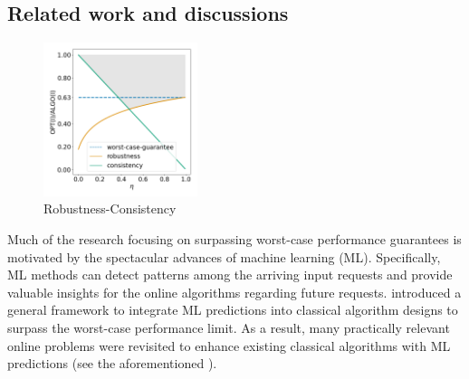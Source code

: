 \subsection{Related work and discussions}

\begin{figure}
 \vspace{-0.6cm}
  \begin{center}
    \includegraphics[width=0.4\textwidth]{../paper/Img/consistency_robustness.png}
  \end{center}
  \vspace{-0.6cm}
  \caption{Robustness-Consistency}
  \label{fig:robustness-consistency}
   \vspace{-0.5cm}
\end{figure}

Much of the research focusing on surpassing worst-case performance guarantees is motivated by the spectacular advances of machine learning (ML). Specifically, ML methods can detect patterns among the arriving input requests and provide valuable insights for the online algorithms regarding future requests. \cite{LykourisVassilvtiskii18:Competitive-caching} introduced a general framework to integrate ML predictions into classical algorithm designs to surpass the worst-case performance limit.
As a result, many practically relevant online problems were revisited to enhance existing classical algorithms with ML predictions (see the aforementioned \cite{LattanziLavastida20:Online-scheduling,Mitzenmacher20:Scheduling-with,LykourisVassilvtiskii18:Competitive-caching,Rohatgi20:Near-optimal-bounds,AntoniadisCoester20:Online-metric,GollapudiPanigrahi19:Online-algorithms,KumarPurohit18:Improving-online,AngelopoulosDurr20:Online-Computation,HsuIndyk19:Learning-Based-Frequency,KraskaBeutel18:The-case-for-learned,Mitzenmacher18:A-model-for-learned}).

